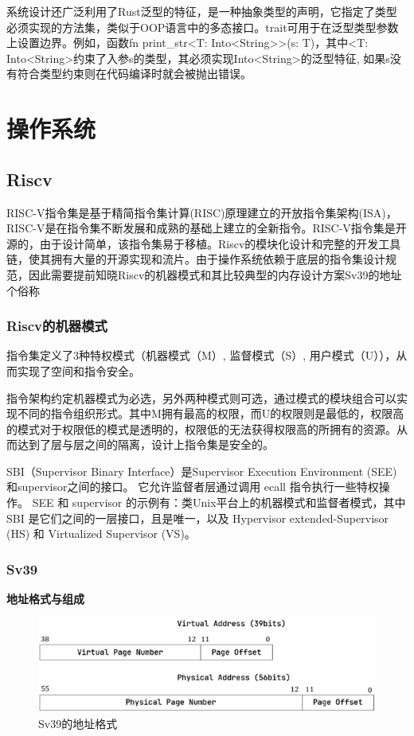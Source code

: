 系统设计还广泛利用了Rust泛型的特征，是一种抽象类型的声明，它指定了类型必须实现的方法集，类似于OOP语言中的多态接口。trait可用于在泛型类型参数上设置边界。例如，函数fn print\_str<T: Into<String>>(s: T){}，其中<T: Into<String>约束了入参s的类型，其必须实现Into<String>的泛型特征, 如果s没有符合类型约束则在代码编译时就会被抛出错误。

\section{操作系统}

\subsection{Riscv}

RISC-V指令集是基于精简指令集计算(RISC)原理建立的开放指令集架构(ISA)，RISC-V是在指令集不断发展和成熟的基础上建立的全新指令。RISC-V指令集是开源的，由于设计简单，该指令集易于移植。Riscv的模块化设计和完整的开发工具链，使其拥有大量的开源实现和流片。由于操作系统依赖于底层的指令集设计规范，因此需要提前知晓Riscv的机器模式和其比较典型的内存设计方案Sv39的地址个俗称
\subsubsection{Riscv的机器模式}

指令集定义了3种特权模式（机器模式（M）, 监督模式（S）, 用户模式（U）），从而实现了空间和指令安全。

指令架构约定机器模式为必选，另外两种模式则可选，通过模式的模块组合可以实现不同的指令组织形式。其中M拥有最高的权限，而U的权限则是最低的，权限高的模式对于权限低的模式是透明的，权限低的无法获得权限高的所拥有的资源。从而达到了层与层之间的隔离，设计上指令集是安全的。

SBI（Supervisor Binary Interface）是Supervisor Execution Environment (SEE)和supervisor之间的接口。 它允许监督者层通过调用 ecall 指令执行一些特权操作。 SEE 和 supervisor 的示例有：类Unix平台上的机器模式和监督者模式，其中 SBI 是它们之间的一层接口，且是唯一，以及 Hypervisor extended-Supervisor (HS) 和 Virtualized Supervisor (VS)。

\subsubsection{Sv39}

\textbf{地址格式与组成}

\begin{figure}[htb]
    \figureCapSet
    \centering
    \includegraphics[width=.8\linewidth]{figure/c2/addressstructure.png}
    \caption{Sv39的地址格式}
    \label{figure:c2addressstructure}
\end{figure}

